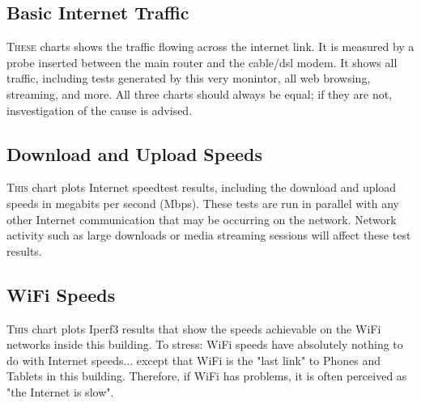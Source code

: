 \documentclass[letterpaper,12pt]{article}
\begin{document}
\newpage
\begin{landscape}
\section{Basic Internet Traffic}
\lettrine{T}{hese}
charts shows the traffic flowing across the internet link.  It is measured by a probe inserted between the main router and the cable/dsl modem.  It shows all traffic, including tests generated by this very monintor, all web browsing, streaming, and more. All three charts should always be equal; if they are not,
insvestigation of the cause is advised. 
\begin{center}
\label{visina8}%
\end{center}
\end{landscape}

\newpage
\begin{landscape}
\section{Download and Upload Speeds}

\lettrine{T}{his}
chart plots Internet speedtest results, including the download and upload speeds in megabits per second (Mbps). These tests are run in parallel with any other Internet communication that may be occurring on the network. Network activity such as large downloads or media streaming sessions will affect these test results.
\begin{center}
\label{visina8}%
\end{center}
\end{landscape}


\newpage
\begin{landscape}
\section{WiFi Speeds}

\lettrine{T}{his}
chart plots Iperf3 results that show the speeds achievable on the WiFi networks inside this building.  To stress: WiFi speeds have absolutely nothing to do with Internet speeds... except that WiFi is the "last link" to Phones and Tablets in this building.  Therefore, if WiFi has problems, it is often perceived as "the Internet is slow".  
\begin{center}
\label{visina8}%
\label{visina8}%
\end{center}
\end{landscape}
\end{document}
